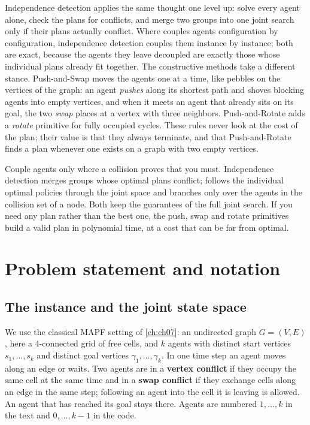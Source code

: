 Independence detection applies the same thought one level up: solve every
agent alone, check the plans for conflicts, and merge two groups into one
joint search only if their plans actually conflict. Where \mstar couples
agents configuration by configuration, independence detection couples them
instance by instance; both are exact, because the agents they leave
decoupled are exactly those whose individual plans already fit together.
The constructive methods take a different stance. Push-and-Swap moves the
agents one at a time, like pebbles on the vertices of the graph: an agent
\emph{pushes} along its shortest path and shoves blocking agents into empty
vertices, and when it meets an agent that already sits on its goal, the two
\emph{swap} places at a vertex with three neighbors. Push-and-Rotate adds a
\emph{rotate} primitive for fully occupied cycles. These rules never look at
the cost of the plan; their value is that they always terminate, and that
Push-and-Rotate finds a plan whenever one exists on a graph with two empty
vertices.

\begin{keyidea}
Couple agents only where a collision proves that you must. Independence
detection merges groups whose optimal plans conflict; \mstar follows the
individual optimal policies through the joint space and branches only over
the agents in the collision set of a node. Both keep the guarantees of the
full joint search. If you need any plan rather than the best one, the push,
swap and rotate primitives build a valid plan in polynomial time, at a cost
that can be far from optimal.
\end{keyidea}

\section{Problem statement and notation}
\label{sec:ch11-problem}

\subsection{The instance and the joint state space}

We use the classical MAPF setting of \cref{ch:ch07}: an undirected graph
$G = (V, E)$, here a 4-connected grid of free cells, and $k$
agents with distinct start vertices $s_1, \dots, s_k$ and
distinct goal vertices $\gamma_1, \dots, \gamma_k$. In one time step an
agent moves along an edge or waits. Two agents are in a \textbf{vertex
conflict} if they occupy the same cell at the same
time and in a \textbf{swap conflict} if they exchange
cells along an edge in the same step; following an agent into the cell it
is leaving is allowed. An agent that has reached its goal stays there.
Agents are numbered $1, \dots, k$ in the text and $0, \dots, k-1$ in the
code.

